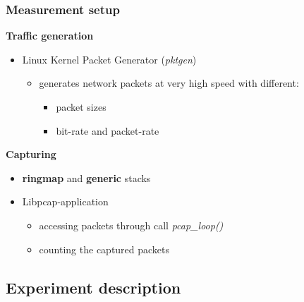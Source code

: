 \documentclass{beamer}
\begin{document}
\begin{frame}
\frametitle{Measurement setup}
\textbf{Traffic generation}
\begin{itemize}
	\item Linux Kernel Packet Generator (\emph{pktgen})
		\begin{itemize}
			\item generates network packets at very high speed with different: 
				\begin{itemize}
					\item packet sizes
					\item bit-rate and packet-rate
				\end{itemize}
		\end{itemize}
\end{itemize}
\textbf{Capturing}
\begin{itemize}
	\item \textbf{ringmap} and \textbf{generic} stacks
	\item Libpcap-application
		\begin{itemize}
			\item accessing packets through call \emph{pcap\_loop()}
			\item counting the captured packets
		\end{itemize}
\end{itemize}
\end{frame}

\subsection*{Experiment description}
\end{document}
